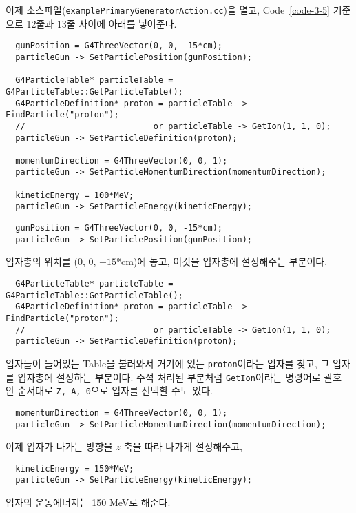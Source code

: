 이제 소스파일(\texttt{examplePrimaryGeneratorAction.cc})을 열고,
Code~\ref{code-3-5} 기준으로 12줄과 13줄 사이에 아래를 넣어준다.
\begin{pc}
\begin{lstlisting}
  gunPosition = G4ThreeVector(0, 0, -15*cm);
  particleGun -> SetParticlePosition(gunPosition);

  G4ParticleTable* particleTable = G4ParticleTable::GetParticleTable();
  G4ParticleDefinition* proton = particleTable -> FindParticle("proton");
  //                          or particleTable -> GetIon(1, 1, 0);
  particleGun -> SetParticleDefinition(proton);

  momentumDirection = G4ThreeVector(0, 0, 1); 
  particleGun -> SetParticleMomentumDirection(momentumDirection);

  kineticEnergy = 100*MeV;
  particleGun -> SetParticleEnergy(kineticEnergy);
\end{lstlisting}
\end{pc}
\begin{pc}
\begin{lstlisting}
  gunPosition = G4ThreeVector(0, 0, -15*cm);
  particleGun -> SetParticlePosition(gunPosition);
\end{lstlisting}
\end{pc}
입자총의 위치를 (0, 0, $-15$*cm)에 놓고, 이것을 입자총에 설정해주는 부분이다.
\begin{pc}
\begin{lstlisting}
  G4ParticleTable* particleTable = G4ParticleTable::GetParticleTable();
  G4ParticleDefinition* proton = particleTable -> FindParticle("proton");
  //                          or particleTable -> GetIon(1, 1, 0);
  particleGun -> SetParticleDefinition(proton);
\end{lstlisting}
\end{pc}
입자들이 들어있는 Table을 불러와서 거기에 있는 \texttt{proton}이라는 입자를
찾고, 그 입자를 입자총에 설정하는 부분이다. 주석 처리된 부분처럼
\texttt{GetIon}이라는 명령어로 괄호 안 순서대로 \texttt{Z, A, 0}으로 입자를
선택할 수도 있다.
\begin{pc}
\begin{lstlisting}
  momentumDirection = G4ThreeVector(0, 0, 1); 
  particleGun -> SetParticleMomentumDirection(momentumDirection);
\end{lstlisting}
\end{pc}
이제 입자가 나가는 방향을 $z$ 축을 따라 나가게 설정해주고,
\begin{pc}
\begin{lstlisting}
  kineticEnergy = 150*MeV;
  particleGun -> SetParticleEnergy(kineticEnergy);
\end{lstlisting}
\end{pc}
입자의 운동에너지는 150 MeV로 해준다.

